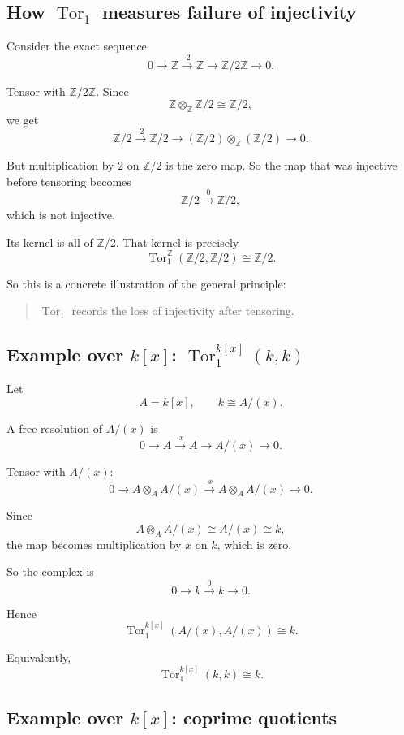 \documentclass[12pt,a4paper]{article}
\theoremstyle{notespace}
\begin{document}
\subsection{How \(\operatorname{Tor}_1\) measures failure of injectivity}

Consider the exact sequence
\[
0\to \mathbb Z \xrightarrow{\cdot 2} \mathbb Z \to \mathbb Z/2\mathbb Z \to 0.
\]

Tensor with \(\mathbb Z/2\mathbb Z\). Since
\[
\mathbb Z\otimes_{\mathbb Z}\mathbb Z/2 \cong \mathbb Z/2,
\]
we get
\[
\mathbb Z/2 \xrightarrow{\cdot 2} \mathbb Z/2 \to (\mathbb Z/2)\otimes_{\mathbb Z}(\mathbb Z/2)\to 0.
\]

But multiplication by \(2\) on \(\mathbb Z/2\) is the zero map. So the map that was injective before tensoring becomes
\[
\mathbb Z/2 \xrightarrow{0} \mathbb Z/2,
\]
which is not injective.

Its kernel is all of \(\mathbb Z/2\). That kernel is precisely
\[
\operatorname{Tor}_1^{\mathbb Z}(\mathbb Z/2,\mathbb Z/2)\cong \mathbb Z/2.
\]

So this is a concrete illustration of the general principle:

\begin{quote}
	\(\operatorname{Tor}_1\) records the loss of injectivity after tensoring.
\end{quote}

\subsection{Example over \(k[x]\): \(\operatorname{Tor}_1^{k[x]}(k,k)\)}

Let
\[
A=k[x],
\qquad
k\cong A/(x).
\]

A free resolution of \(A/(x)\) is
\[
0\to A \xrightarrow{\cdot x} A \to A/(x)\to 0.
\]

Tensor with \(A/(x)\):
\[
0\to A\otimes_A A/(x) \xrightarrow{\cdot x} A\otimes_A A/(x) \to 0.
\]

Since
\[
A\otimes_A A/(x)\cong A/(x)\cong k,
\]
the map becomes multiplication by \(x\) on \(k\), which is zero.

So the complex is
\[
0\to k \xrightarrow{0} k \to 0.
\]

Hence
\[
\operatorname{Tor}_1^{k[x]}(A/(x),A/(x))
\cong k.
\]

Equivalently,
\[
\operatorname{Tor}_1^{k[x]}(k,k)\cong k.
\]

\subsection{Example over \(k[x]\): coprime quotients}
\end{document}
